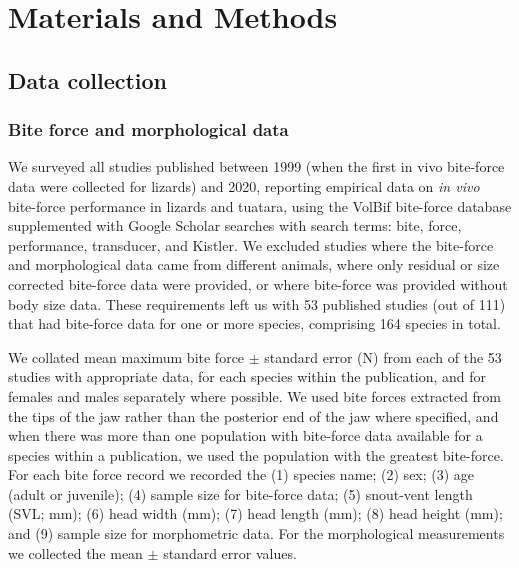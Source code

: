 \documentclass[a4paper, 12pt]{article}
\begin{document}

\section{Materials and Methods}

\subsection{Data collection}

\subsubsection{Bite force and morphological data}
We surveyed all studies published between 1999 (when the first in vivo bite-force data were collected for lizards) and 2020, reporting empirical data on \textit{in vivo} bite-force performance in lizards and tuatara, using the VolBif bite-force database \cite{lappin2014reliable} supplemented with Google Scholar searches with search terms: bite, force, performance, transducer, and Kistler. 
We excluded studies where the bite-force and morphological data came from different animals, where only residual or size corrected bite-force data were provided, or where bite-force was provided without body size data. 
These requirements left us with 53 published studies (out of 111) that had bite-force data for one or more species, comprising 164 species in total. 

We collated mean maximum bite force $\pm$ standard error (N) from each of the 53 studies with appropriate data, for each species within the publication, and for females and males separately where possible. 
We used bite forces extracted from the tips of the jaw rather than the posterior end of the jaw where specified\cite{lappin2014reliable}, and when there was more than one population with bite-force data available for a species within a publication, we used the population with the greatest bite-force. 
For each bite force record we recorded the (1) species name; (2) sex; (3) age (adult or juvenile); (4) sample size for bite-force data; (5) snout-vent length (SVL; mm); (6) head width (mm); (7) head length (mm); (8) head height (mm); and (9) sample size for morphometric data. 
For the morphological measurements we collected the mean $\pm$ standard error values. 
\end{document}
